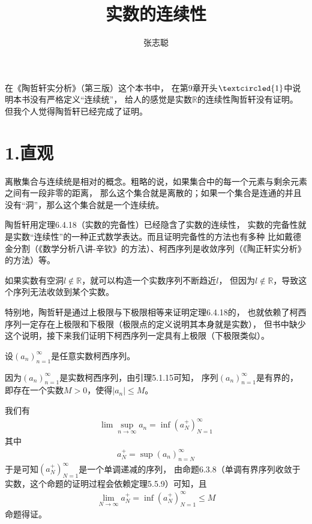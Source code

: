 \documentclass{article}
\begin{document}
\title{实数的连续性}
\author{张志聪}
\maketitle

\begin{zremark}
    在《陶哲轩实分析》（第三版）这个本书中，
    在第9章开头$\textcircled{1}$中说明本书没有严格定义“连续统”，
    给人的感觉是实数$\mathbb{R}$的连续性陶哲轩没有证明。
    但我个人觉得陶哲轩已经完成了证明。
\end{zremark}

\section*{1.直观}

离散集合与连续统是相对的概念。粗略的说，如果集合中的每一个元素与剩余元素之间有一段非零的距离，
那么这个集合就是离散的；如果一个集合是连通的并且没有“洞”，那么这个集合就是一个连续统。

陶哲轩用定理6.4.18（实数的完备性）已经隐含了实数的连续性，
实数的完备性就是实数“连续性”的一种正式数学表达。而且证明完备性的方法也有多种
比如戴德金分割（《数学分析八讲-辛钦》的方法）、柯西序列是收敛序列（《陶正轩实分析》的方法）等。

如果实数有空洞$l \notin \mathbb{R}$，就可以构造一个实数序列不断趋近$l$，
但因为$l \notin \mathbb{R}$，导致这个序列无法收敛到某个实数。

特别地，陶哲轩是通过上极限与下极限相等来证明定理6.4.18的，
也就依赖了柯西序列一定存在上极限和下极限（极限点的定义说明其本身就是实数），
但书中缺少这个说明，接下来我们证明下柯西序列一定具有上极限（下极限类似）。

设$(a_n)_{n = 1}^\infty$是任意实数柯西序列。

因为$(a_n)_{n = 1}^\infty$是实数柯西序列，由引理5.1.15可知，
序列$(a_n)_{n = 1}^\infty$是有界的，
即存在一个实数$M > 0$，使得$|a_n| \leq M$。

我们有
\begin{align*}
  \lim\sup\limits_{n \to \infty} a_n = \inf(a_N^+)_{N = 1}^\infty
\end{align*}
其中
\begin{align*}
  a_N^+ = \sup(a_n)_{n = N}^\infty
\end{align*}
于是可知$(a_N^+)_{N = 1}^\infty$是一个单调递减的序列，
由命题6.3.8（单调有界序列收敛于实数，这个命题的证明过程会依赖定理5.5.9）可知，且
\begin{align*}
  \lim\limits_{N \to \infty} a_N^+ = \inf(a_N^+)_{N = 1}^\infty \leq M
\end{align*}
命题得证。
\end{document}
